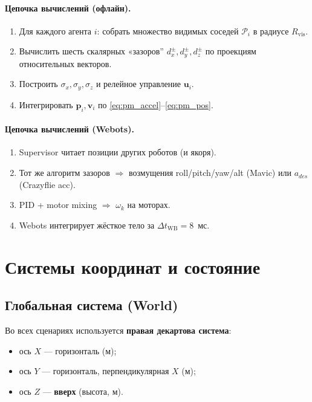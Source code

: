 \documentclass[a4paper,11pt]{article}
\newcommand{\vect}[1]{\bm{#1}}
\begin{document}
\paragraph{Цепочка вычислений (офлайн).}
\begin{enumerate}
  \item Для каждого агента $i$: собрать множество видимых соседей
  $\mathcal{P}_i$ в радиусе $R_{\mathrm{vis}}$.
  \item Вычислить шесть скалярных «зазоров'' $d_x^\pm, d_y^\pm, d_z^\pm$
  по проекциям относительных векторов.
  \item Построить $\sigma_x, \sigma_y, \sigma_z$ и релейное управление
  $\vect{u}_i$.
  \item Интегрировать $\vect{p}_i, \vect{v}_i$ по \eqref{eq:pm_accel}--\eqref{eq:pm_pos}.
\end{enumerate}

\paragraph{Цепочка вычислений (Webots).}
\begin{enumerate}
  \item Supervisor читает позиции других роботов (и якоря).
  \item Тот же алгоритм зазоров $\Rightarrow$ возмущения roll/pitch/yaw/alt
  (Mavic) или $a_{des}$ (Crazyflie acc).
  \item PID + motor mixing $\Rightarrow$ $\omega_k$ на моторах.
  \item Webots интегрирует жёсткое тело за $\Delta t_{\mathrm{WB}}=8$~мс.
\end{enumerate}

\section{Системы координат и состояние}

\subsection{Глобальная система (World)}

Во всех сценариях используется \textbf{правая декартова система}:
\begin{itemize}
  \item ось $X$ --- горизонталь (м);
  \item ось $Y$ --- горизонталь, перпендикулярная $X$ (м);
  \item ось $Z$ --- \textbf{вверх} (высота, м).
\end{itemize}
\end{document}
